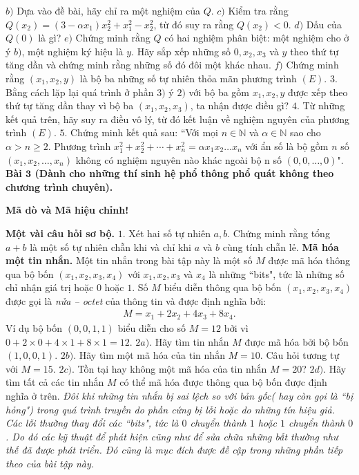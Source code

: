 \begin{multicols}{2}
	\vskip 0.1cm
	$b)$ Dựa vào đề bài, hãy chỉ ra một nghiệm của $Q$.
	\vskip 0.1cm
	$c)$ Kiểm tra rằng $Q(x_2 )=(3- \alpha x_1 )x_2^2+x_1^2-x_2^2$, từ đó suy ra rằng $Q(x_2 )<0$.
	\vskip 0.1cm 
	$d)$ Dấu của $Q(0)$ là gì?
	\vskip 0.1cm 
	$e)$ Chứng minh rằng $Q$ có hai nghiệm phân biệt: một nghiệm cho ở ý $b)$, một nghiệm ký hiệu là $y$. Hãy sắp xếp những số $0,x_2,x_3$ và $y$ theo thứ tự tăng dần và chứng minh rằng những số đó đôi một khác nhau. 
	\vskip 0.1cm
	$f)$ Chứng minh rằng $(x_1,x_2,y)$ là bộ ba những số tự nhiên thỏa mãn phương trình $(E)$.
	\vskip 0.1cm 
	$3.$ Bằng cách lặp lại quá trình ở phần $3)$ ý $2)$ với bộ ba gồm $x_1,x_2,y$ được xếp theo thứ tự tăng dần thay vì bộ ba $(x_1,x_2,x_3)$, ta nhận được điều gì?
	\vskip 0.1cm
	$4.$ Từ những kết quả trên, hãy suy ra điều vô lý, từ đó kết luận về nghiệm nguyên của phương trình $(E)$.
	\vskip 0.1cm
	$5.$ Chứng minh kết quả sau: ``Với mọi $n \in \mathbb{N}$ và  $\alpha \in \mathbb{N}$ sao cho  $\alpha>n\ge2$. Phương trình $x_1^2+x_2^2+⋯+x_n^2= \alpha x_1 x_2\ldots x_n$  với ẩn số là bộ gồm $n$ số $(x_1,x_2,\ldots,x_n)$ không có nghiệm nguyên nào khác ngoài bộ n số $(0,0,\ldots,0)$". 
	\vskip 0.1cm
	 \textbf{\color{cackithi}Bài $\pmb{3}$ (Dành cho những thí sinh hệ phổ thông phổ quát không theo chương trình chuyên).} 
	\vskip 0.1cm
	\centerline{ \textbf{\color{cackithi}Mã dò và Mã hiệu chỉnh!}}
	\vskip 0.1cm 
	 \textbf{\color{cackithi}Một vài câu hỏi sơ bộ.}
	\vskip 0.1cm
	$1.$ Xét hai số tự nhiên $a,b$. Chứng minh rằng tổng $a+b$ là một số tự nhiên chẵn khi và chỉ khi $a$ và $b$ cùng tính chẵn lẻ. 
	\vskip 0.1cm
	 \textbf{\color{cackithi}Mã hóa một tin nhắn.}
	\vskip 0.1cm
	Một tin nhắn trong bài tập này là một số $M$ được mã hóa thông qua bộ bốn $(x_1,x_2,x_3,x_4)$ với $x_1,x_2,x_3 $ và $ x_4$ là những ``bits", tức là những số chỉ nhận giá trị hoặc $0$ hoặc $1$. Số $M$ biểu diễn thông qua bộ bốn $(x_1,x_2,x_3,x_4)$ được gọi là \textit{nửa -- octet} của thông tin và được định nghĩa bởi: 
	\begin{align*}
		M=x_1+2x_2+4x_3+8x_4.
	\end{align*}
	Ví dụ bộ bốn $(0,0,1,1)$ biểu diễn cho số $M=12$ bởi vì $0+2 \times 0+4\times1+8 \times 1=12$. 
	\vskip 0.1cm
	$2a)$. Hãy tìm tin nhắn $M$ được mã hóa bởi bộ bốn $(1,0,0,1)$.
	\vskip 0.1cm
	$2b)$. Hãy tìm một mã hóa của tin nhắn $M=10$. Câu hỏi tương tự với $M=15$.
	\vskip 0.1cm
	$2c)$. Tồn tại hay không một mã hóa của tin nhắn $M=20$? 
	\vskip 0.1cm
	$2d)$. Hãy tìm tất cả các tin nhắn $M$ có thể mã hóa được thông qua bộ bốn được định nghĩa ở trên. 
	\vskip 0.1cm
	\textit{Đôi khi những tin nhắn bị sai lệch so với bản gốc( hay còn gọi là ``bị hỏng") trong quá trình truyền do phần cứng bị lỗi hoặc do những tín hiệu giả. Các lỗi thường thay đổi các ``bits", tức là $0$ chuyển thành $1$ hoặc $1$ chuyển thành $0$. Do đó các kỹ thuật để phát hiện cũng như để sửa chữa những bất thường như thế đã được phát triển. Đó cũng là mục đích được đề cập trong những phần tiếp theo của bài tập này.}

\end{multicols}
